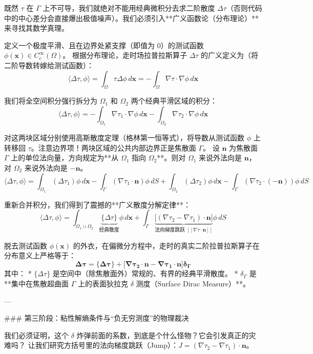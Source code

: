 \documentclass[12pt]{article}
\begin{document}
{既然 $\tau$ 在 $\Gamma$ 上不可导，我们就绝对不能用经典微积分去求二阶散度 $\Delta \tau$（否则代码中的中心差分会直接爆出极值噪声）。我们必须引入**广义函数论（分布理论）**来寻找其数学真理。

定义一个极度平滑、且在边界处紧支撑（即值为 0）的测试函数 $\phi(\mathbf{x}) \in C_c^\infty(\Omega)$。
根据分布理论，走时场拉普拉斯算子 $\Delta \tau$ 的广义定义为（将二阶导数转嫁给测试函数）：
$$ \langle \Delta \tau, \phi \rangle = \int_{\Omega} \tau \Delta \phi \, d\mathbf{x} = - \int_{\Omega} \nabla \tau \cdot \nabla \phi \, d\mathbf{x} $$

我们将全空间积分强行拆分为 $\Omega_1$ 和 $\Omega_2$ 两个经典平滑区域的积分：
$$ \langle \Delta \tau, \phi \rangle = - \int_{\Omega_1} \nabla \tau_1 \cdot \nabla \phi \, d\mathbf{x} - \int_{\Omega_2} \nabla \tau_2 \cdot \nabla \phi \, d\mathbf{x} $$

对这两块区域分别使用高斯散度定理（格林第一恒等式），将导数从测试函数 $\phi$ 上转移回 $\tau$。注意边界项！两块区域的公共内部边界正是焦散面 $\Gamma$。
设 $\mathbf{n}$ 为焦散面 $\Gamma$ 上的单位法向量，方向规定为**从 $\Omega_1$ 指向 $\Omega_2$**。则对 $\Omega_1$ 来说外法向是 $\mathbf{n}$，对 $\Omega_2$ 来说外法向是 $-\mathbf{n}$。
$$ \langle \Delta \tau, \phi \rangle = \int_{\Omega_1} (\Delta \tau_1) \phi \, d\mathbf{x} - \int_{\Gamma} (\nabla \tau_1 \cdot \mathbf{n}) \phi \, dS + \int_{\Omega_2} (\Delta \tau_2) \phi \, d\mathbf{x} - \int_{\Gamma} (\nabla \tau_2 \cdot (-\mathbf{n})) \phi \, dS $$

重新合并积分，我们得到了震撼的**广义散度分解定律**：
$$ \langle \Delta \tau, \phi \rangle = \int_{\Omega_1 \cup \Omega_2} \underbrace{\{\Delta \tau\}}_{\text{经典散度}} \phi \, d\mathbf{x} + \int_{\Gamma} \underbrace{\Big[ (\nabla \tau_2 - \nabla \tau_1) \cdot \mathbf{n} \Big]}_{\text{法向梯度跳跃 } [\![ \nabla \tau \cdot \mathbf{n} ]\!]} \phi \, dS $$

脱去测试函数 $\phi(\mathbf{x})$ 的外衣，在偏微分方程中，走时的真实二阶拉普拉斯算子在分布意义上严格等于：
$$ \mathbf{\Delta \tau = \{\Delta \tau\} + \Big[ \nabla \tau_2 \cdot \mathbf{n} - \nabla \tau_1 \cdot \mathbf{n} \Big] \delta_{\Gamma}} $$
其中：
*   $\{\Delta \tau\}$ 是空间中（除焦散面外）常规的、有界的经典平滑散度。
*   $\delta_{\Gamma}$ 是**集中在焦散超曲面 $\Gamma$ 上的表面狄拉克 $\delta$ 测度（Surface Dirac Measure）**。

---

### 第三阶段：粘性解熵条件与“负无穷测度”的物理裁决

我们必须证明，这个 $\delta$ 炸弹前面的系数，到底是个什么怪物？它会引发真正的灾难吗？
让我们研究方括号里的法向梯度跳跃（Jump）：$J = (\nabla \tau_2 - \nabla \tau_1) \cdot \mathbf{n}$。

}
\end{document}
